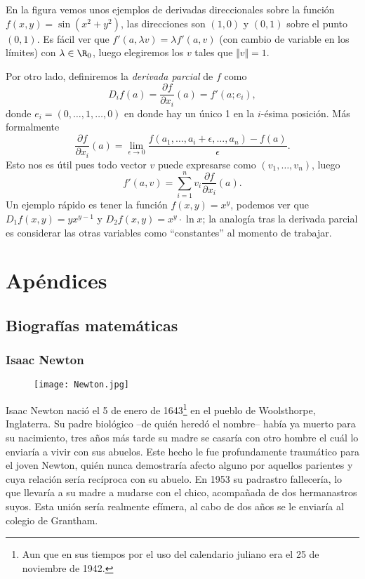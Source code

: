 \documentclass[11pt,oneside,a4paper]{book}
\begin{document}
En la figura vemos unos ejemplos de derivadas direccionales sobre la función $f(x,y)=\sin(x^2+y^2)$, las direcciones son $(1,0)$ y $(0,1)$ sobre el punto $(0,1)$. Es fácil ver que $f'(a,\lambda v)=\lambda f'(a,v)$ (con cambio de variable en los límites) con $\lambda\in\R_0$, luego elegiremos los $v$ tales que $\Vert v\Vert=1$.

Por otro lado, definiremos la \textit{derivada parcial} de $f$ como
$$D_if(a)=\frac{\partial f}{\partial x_i}(a)=f'(a;e_i),$$
donde $e_i=(0,\dots,1,\dots,0)$ en donde hay un único 1 en la $i$-ésima posición. Más formalmente
\begin{equation}
\frac{\partial f}{\partial x_i}(a)=\lim_{\epsilon\to 0}\frac{f(a_1,\dots,a_i+\epsilon,\dots,a_n)-f(a)}{\epsilon}.
\end{equation}
Esto nos es útil pues todo vector $v$ puede expresarse como $(v_1,\dots,v_n)$, luego
\begin{equation}
f'(a,v)=\sum_{i=1}^n v_i\frac{\partial f}{\partial x_i}(a).
\end{equation}
Un ejemplo rápido es tener la función $f(x,y)=x^y$, podemos ver que $D_1f(x,y)=yx^{y-1}$ y $D_2f(x,y)=x^y\cdot\ln x$; la analogía tras la derivada parcial es considerar las otras variables como ``constantes'' al momento de trabajar.

\part*{Apéndices}
\appendix
\chapter{Biografías matemáticas}
\section{Isaac Newton}
\begin{wrapfigure}{R}{.3\textwidth}
\texttt{[image: Newton.jpg]}
\caption{}
\end{wrapfigure}
Isaac Newton nació el 5 de enero de 1643\footnote{Aun que en sus tiempos por el uso del calendario juliano era el 25 de noviembre de 1942.} en el pueblo de Woolsthorpe, Inglaterra. Su padre biológico --de quién heredó el nombre-- había ya muerto para su nacimiento, tres años más tarde su madre se casaría con otro hombre el cuál lo enviaría a vivir con sus abuelos. Este hecho le fue profundamente traumático para el joven Newton, quién nunca demostraría afecto alguno por aquellos parientes y cuya relación sería recíproca con su abuelo. En 1953 su padrastro fallecería, lo que llevaría a su madre a mudarse con el chico, acompañada de dos hermanastros suyos. Esta unión sería realmente efímera, al cabo de dos años se le enviaría al colegio de Grantham.
\end{document}
